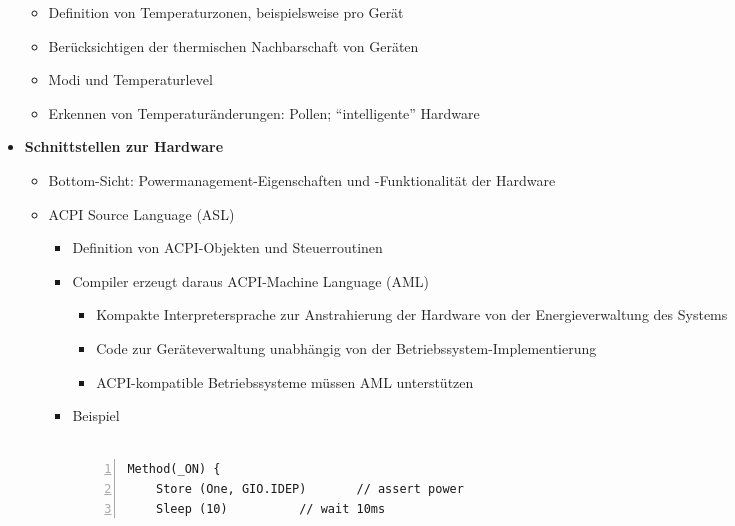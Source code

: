 \begin{itemize}
	\begin{itemize}
		\item Definition von Temperaturzonen, beispielsweise pro Gerät
		\item Berücksichtigen der thermischen Nachbarschaft von Geräten
		\item Modi und Temperaturlevel
		\item Erkennen von Temperaturänderungen: Pollen; "`intelligente"' Hardware
	\end{itemize}
	\item \textbf{Schnittstellen zur Hardware}
	\begin{itemize}
		\item Bottom-Sicht: Powermanagement-Eigenschaften und -Funktionalität der Hardware
		\item ACPI Source Language (ASL)
		\begin{itemize}
			\item Definition von ACPI-Objekten und Steuerroutinen
			\item Compiler erzeugt daraus ACPI-Machine Language (AML)
			\begin{itemize}
				\item Kompakte Interpretersprache zur Anstrahierung der Hardware von der Energieverwaltung des Systems
				\item Code zur Geräteverwaltung unabhängig von der Betriebssystem-Implementierung
				\item ACPI-kompatible Betriebssysteme müssen AML unterstützen
			\end{itemize}
			\item Beispiel\\\\
				\begin{minipage}{\textwidth}
				\begin{lstlisting}[frame=single,numbers=left,mathescape]
Method(_ON) {
	Store (One, GIO.IDEP)		// assert power
	Sleep (10)			// wait 10ms

\end{lstlisting}
\end{minipage}
\end{itemize}
\end{itemize}
\end{itemize}
